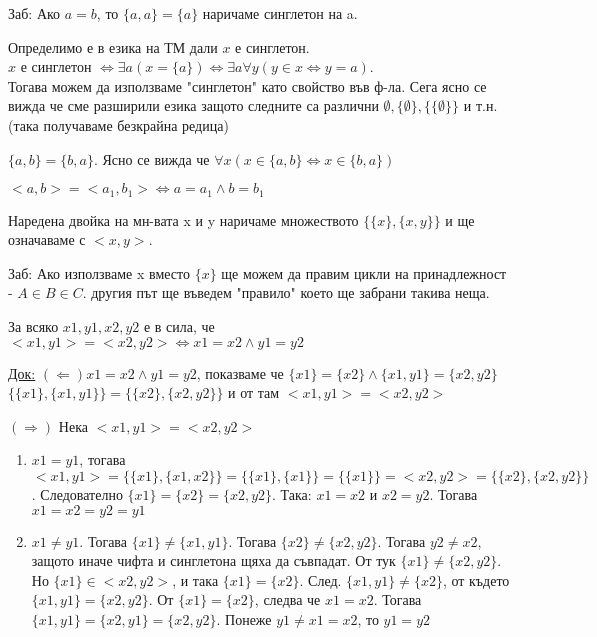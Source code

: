 \documentclass[fleqn, titlepage, 12pt]{report}
\begin{document}
Заб: Ако $a = b$, то $ \{a,a\} = \{a\}$ наричаме синглетон на a.
\bigbreak

Определимо е в езика на ТМ дали $x$ е синглетон.\\
$x$ е синглетон
$ \Leftrightarrow \exists{a}(x = \{a\}) \Leftrightarrow \exists{a} \forall{y}(y \in x \Leftrightarrow  y = a)$.\\
Тогава можем да използваме "синглетон" като свойство във ф-ла. Сега ясно се вижда че сме разширили езика защото следните
са различни $ \emptyset, \{\emptyset\}, \{ \{\emptyset\}\}$ и т.н. (така получаваме безкрайна редица)
\bigbreak

 $\{ a, b\} = \{ b, a\}$. Ясно се вижда че $ \forall{x} (x \in \{ a,b\} \Leftrightarrow x \in \{ b, a\})$
\bigbreak

 $<a,b> = <a_1,b_1> \Leftrightarrow a = a_1 \land b = b_1$
\bigbreak

 Наредена двойка на мн-вата x и y наричаме множеството $ \{ \{ x\}, \{ x, y\}\}$ и ще означаваме с $<x,y>$.
\bigbreak

Заб: Ако използваме x вместо $ \{ x\}$ ще можем да правим цикли на принадлежност - $A \in B \in  C$. другия път ще
въведем "правило" което ще забрани такива неща.
\bigbreak

 За всяко $x1, y1, x2, y2$ е в сила, че $<x1,y1> = <x2,y2> \Leftrightarrow x1 = x2 \land y1 = y2$
\bigbreak

\underline{Док:} $ (\Leftarrow) x1 = x2 \land  y1 = y2$,
показваме че $ \{ x1\} = \{ x2\} \land \{ x1, y1\} = \{ x2,y2\}$\\
$ \{ \{ x1\}, \{ x1, y1\}\} = \{ \{ x2\}, \{ x2, y2\}\}$ и от там $<x1,y1> = <x2,y2>$
\bigbreak

$(\Rightarrow)$ Нека $<x1,y1> = <x2,y2>$
\begin{enumerate}
  \item $x1 = y1$, тогава $<x1,y1> = \{ \{ x1\}, \{ x1,x2\}\} = \{ \{ x1\}, \{ x1\}\} = \{ \{ x1\}\} = <x2,y2> = 
    \{ \{ x2\}, \{ x2,y2\}\}$. Следователно $ \{ x1\} = \{ x2\} = \{ x2, y2\}$. Така: $x1 = x2$ и $x2 = y2$.
    Тогава $x1 = x2 = y2 = y1$
  \item $x1 \neq y1$. Тогава $ \{ x1\} \neq \{ x1, y1\}$. Тогава $ \{ x2\} \neq \{ x2, y2\}$. Тогава $y2 \neq x2$, защото
    иначе чифта и синглетона щяха да съвпадат. От тук $ \{ x1\} \neq  \{ x2, y2\}$. Но $ \{ x1\} \in <x2,y2>$, и така
    $ \{ x1\} = \{ x2\}$. След. $ \{ x1, y1\} \neq \{ x2\}$, от където $\{ x1, y1\} = \{ x2, y2\}$.
    От $ \{ x1\} = \{ x2\}$, следва че $x1 = x2$. Тогава $ \{ x1, y1\} = \{ x2, y1\} = \{ x2, y2\}$.
    Понеже $y1 \neq x1 = x2$, то $y1 = y2$
\end{enumerate}
\bigbreak
\end{document}
